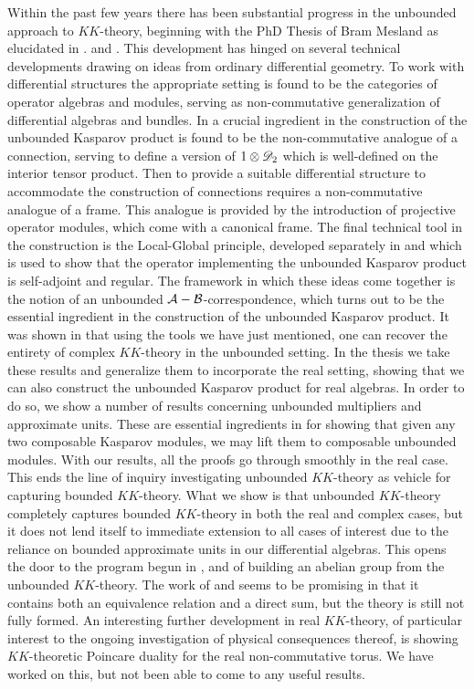 Within the past few years there has been substantial progress in the unbounded approach to $KK$-theory, beginning with the PhD Thesis of Bram Mesland as elucidated in \cite{mesland}.
and \cite{unboundkasp}. This development has hinged on several technical developments drawing on ideas from ordinary differential geometry. 
To work with differential structures the appropriate setting is found to be the categories of operator algebras and modules, serving as non-commutative generalization of differential algebras and bundles. 
In \cite{mesland} a crucial ingredient in the construction of the unbounded Kasparov product is found to be the non-commutative analogue of a connection, serving to define a version of $1\otimes \mathscr{D}_2$ which is well-defined on the interior tensor product. 
Then to provide a suitable differential structure to accommodate the construction of connections requires a non-commutative analogue of a frame. This analogue is provided by the introduction of projective operator modules, which come with a canonical frame. 
The final technical tool in the construction is the Local-Global principle, developed separately in \cite{pierre} and \cite{locglob} which is used to show that the operator implementing the unbounded Kasparov product is self-adjoint and regular.
The framework in which these ideas come together is the notion of an unbounded $\mathcal{A}-\mathcal{B}$-correspondence, which turns out to be the essential ingredient in the construction of the unbounded Kasparov product. 
It was shown in \cite{mesrennie} that using the tools we have just mentioned, one can recover the entirety of complex $KK$-theory in the unbounded setting.
In the thesis we take these results and generalize them to incorporate the real setting, showing that we can also construct the unbounded Kasparov product for real algebras. 
In order to do so, we show a number of results concerning unbounded multipliers and approximate units. These are essential ingredients in \cite[Section 4]{mesrennie} for showing that given any two composable Kasparov modules, we may lift them to composable unbounded modules. With our results, all the proofs go through smoothly in the real case. 
This ends the line of inquiry investigating unbounded $KK$-theory as vehicle for capturing bounded $KK$-theory. What we show is that unbounded $KK$-theory completely captures bounded $KK$-theory in both the real and complex cases, but it does not lend itself to immediate extension to all cases of interest due to the reliance on bounded approximate units in our differential algebras.
This opens the door to the program begun in \cite{jensmorita}, \cite{kaad} and \cite{mesland} of building an abelian group from the unbounded $KK$-theory. The work of \cite{kaad} and \cite{jensmorita} seems to be promising in that it contains both an equivalence relation and a direct sum, but the theory is still not fully formed.  
An interesting further development in real $KK$-theory, of particular interest to the ongoing investigation of physical consequences thereof, is showing $KK$-theoretic Poincare duality for the real non-commutative torus. We have worked on this, but not been able to come to any useful results. 


